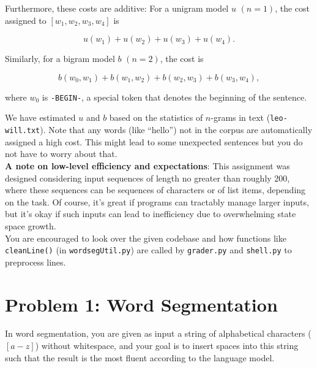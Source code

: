 \documentclass{article}
\theoremstyle{case}
\theoremstyle{definition}
\begin{document}
Furthermore, these costs are additive: For a unigram model $u$ $(n=1)$, the cost assigned to $[w_1,w_2,w_3,w_4]$ is

$$u(w_1)+u(w_2)+u(w_3)+u(w_4).$$

Similarly, for a bigram model $b$ $(n=2)$, the cost is

$$b(w_0,w_1)+b(w_1,w_2)+b(w_2,w_3)+b(w_3,w_4),$$

where $w_0$ is \texttt{-BEGIN-}, a special token that denotes the beginning of the sentence.

We have estimated $u$ and $b$ based on the statistics of $n$-grams in text (\texttt{leo-will.txt}). Note that any words (like ``hello'') not in the corpus are automatically assigned a high cost. This might lead to some unexpected sentences but you do not have to worry about that. \\

\textbf{A note on low-level efficiency and expectations}: This assignment was designed considering input sequences of length no greater than roughly 200, where these sequences can be sequences of characters or of list items, depending on the task. Of course, it's great if programs can tractably manage larger inputs, but it's okay if such inputs can lead to inefficiency due to overwhelming state space growth.\\

You are encouraged to look over the given codebase and how functions like \texttt{cleanLine()} (in \texttt{wordsegUtil.py}) are called by \texttt{grader.py} and \texttt{shell.py} to preprocess lines.
\newpage
\section*{Problem 1: Word Segmentation}

In word segmentation, you are given as input a string of alphabetical characters ($[a-z]$) without whitespace, and your goal is to insert spaces into this string such that the result is the most fluent according to the language model.
\end{document}
